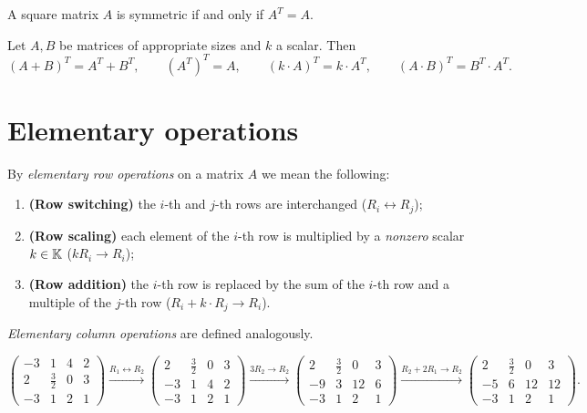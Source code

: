 \begin{fact}
A square matrix $A$ is symmetric if and only if $A^T=A$.
\end{fact}

\begin{theorem}
Let $A,B$ be matrices of appropriate sizes and $k$ a scalar. Then
\[
(A+B)^T = A^T + B^T, \qquad (A^T)^T = A, \qquad (k\cdot A)^T = k\cdot A^T, \qquad (A\cdot B)^T = B^T\cdot A^T.
\]
\end{theorem}

\section{Elementary operations}

\begin{definition}
By \emph{elementary row operations} on a matrix $A$ we mean the following:
\begin{enumerate}
\item \textbf{(Row switching)} the $i$-th and $j$-th rows are interchanged ($R_i\leftrightarrow R_j$);
\item \textbf{(Row scaling)} each element of the $i$-th row is multiplied by a \emph{nonzero} scalar
$k\in \mathbb{K}$ ($kR_i\rightarrow R_i$);
\item \textbf{(Row addition)} the $i$-th row is replaced by the sum of the $i$-th row and a multiple of the
$j$-th row ($R_i+k\cdot R_j\rightarrow R_i$).
\end{enumerate}
\emph{Elementary column operations} are defined analogously.
\end{definition}

\begin{example}
\[
\left( \begin{array}{cccc}
-3 & 1 & 4 & 2\\ 2 & \tfrac{3}{2} & 0 & 3\\ -3 & 1 & 2 & 1
\end{array} \right)
\xrightarrow{R_1\leftrightarrow R_2}
\left( \begin{array}{cccc}
2 & \tfrac{3}{2} & 0 & 3\\ -3 & 1 & 4 & 2\\ -3 & 1 & 2 & 1
\end{array} \right)
\xrightarrow{3R_2\to R_2}
\left( \begin{array}{cccc}
2 & \tfrac{3}{2} & 0 & 3\\ -9 & 3 & 12 & 6\\ -3 & 1 & 2 & 1
\end{array} \right)
\xrightarrow{R_2+2R_1\to R_2}
\left( \begin{array}{cccc}
2 & \tfrac{3}{2} & 0 & 3\\ -5 & 6 & 12 & 12\\ -3 & 1 & 2 & 1
\end{array} \right).
\]
\end{example}

